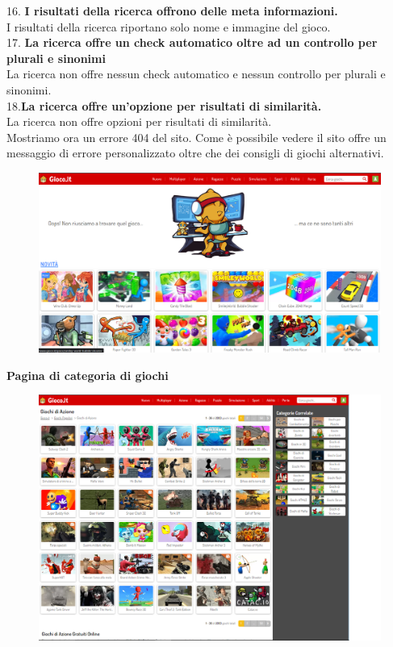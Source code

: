 \documentclass[../Report.tex]{subfiles}
\begin{document}
    16.\textbf{ I risultati della ricerca offrono delle meta informazioni.}\\
    I risultati della ricerca riportano solo nome e immagine del gioco.\\

    17. \textbf{La ricerca offre un check automatico oltre ad un controllo per plurali e sinonimi }\\
    La ricerca non offre nessun check automatico e nessun controllo per plurali e sinonimi.\\

    18.\textbf{La ricerca offre un’opzione per risultati di similarità.}\\
	La ricerca non offre opzioni per risultati di similarità.\\



    Mostriamo ora un errore 404 del sito. Come è possibile vedere il sito offre un messaggio di errore personalizzato oltre che dei consigli di giochi alternativi. 
    
    \begin{figure}[H]
        \includegraphics[width=\linewidth]{Assestment6.png}
        \centering
    \end{figure}

    \textbf{Pagina di categoria di giochi}

    \begin{figure}[H]
        \includegraphics[width=\linewidth]{Assestment7.png}
        \centering
    \end{figure}
    
\end{document}
